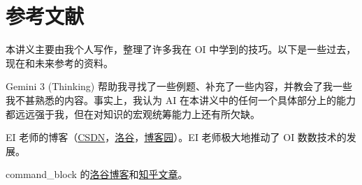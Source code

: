 \chapter*{参考文献}
    本讲义主要由我个人写作，整理了许多我在 OI 中学到的技巧。以下是一些过去，现在和未来参考的资料。

    Gemini 3 (Thinking) 帮助我寻找了一些例题、补充了一些内容，并教会了我一些我不甚熟悉的内容。事实上，我认为 AI 在本讲义中的任何一个具体部分上的能力都远远强于我，但在对知识的宏观统筹能力上还有所欠缺。

    EI 老师的博客（\href{https://blog.csdn.net/EI_Captain}{CSDN}，\href{https://www.luogu.com.cn/user/21423/article}{洛谷}，\href{https://www.cnblogs.com/Elegia}{博客园}）。EI 老师极大地推动了 OI 数数技术的发展。


    command\_block 的\href{https://www.luogu.com.cn/user/58705/article}{洛谷博客}和\href{https://www.zhihu.com/people/lucas-73-31/posts}{知乎文章}。